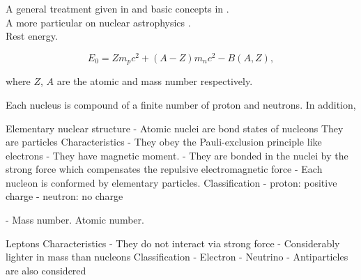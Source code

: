 \documentclass[openany]{book}
\begin{document}
A general treatment given in \cite{basdevant_rich_spiro_2004} and basic concepts in \cite{heyde_2020}. \\

A more particular on nuclear astrophysics \cite{iliadis_2015}. \\

Rest energy.

\begin{equation} \label{eq:restEnergy}
	E_0 = Zm_pc^2 + (A-Z)m_nc^2 - B(A, Z),
\end{equation}

where $Z$, $A$ are the atomic and mass number respectively. 



Each nucleus is compound of a finite number of proton and neutrons. In addition, 

Elementary nuclear structure 
-	Atomic nuclei are bond states of nucleons 
They are particles
Characteristics 
-	They obey the Pauli-exclusion principle like electrons
- 	They have magnetic moment.
-	They are bonded in the nuclei by the strong force which compensates the repulsive electromagnetic force
-	Each nucleon is conformed by elementary particles.
Classification 
-	proton: positive charge
-	neutron: no charge  

-	Mass number. Atomic number.

Leptons 
Characteristics
-	They do not interact via strong force
-	Considerably lighter in mass than nucleons
Classification 
-	Electron 
-	Neutrino 
-	Antiparticles are also considered



\end{document}

